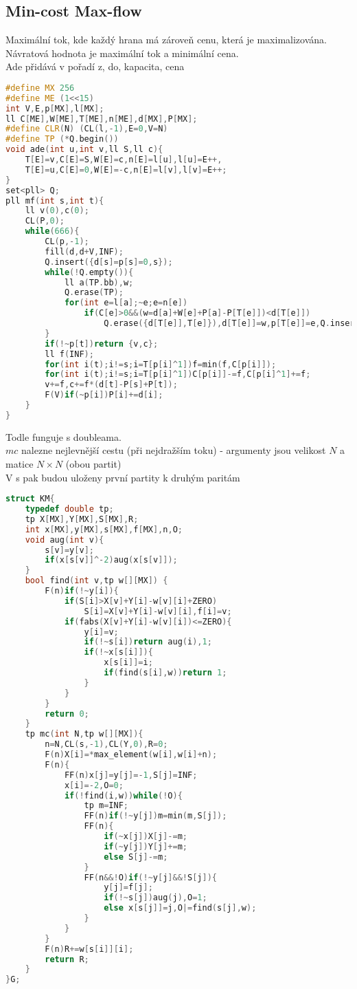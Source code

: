 \documentclass[11pt]{article}
\begin{document}
\subsection{Min-cost Max-flow}
Maximální tok, kde každý hrana má zároveň cenu, která je maximalizována.
\\Návratová hodnota je maximální tok a minimální cena.
\\Ade přidává v pořadí z, do, kapacita, cena
\begin{lstlisting}[language=C++]
#define MX 256
#define ME (1<<15)
int V,E,p[MX],l[MX];
ll C[ME],W[ME],T[ME],n[ME],d[MX],P[MX];
#define CLR(N) (CL(l,-1),E=0,V=N)
#define TP (*Q.begin())
void ade(int u,int v,ll S,ll c){
	T[E]=v,C[E]=S,W[E]=c,n[E]=l[u],l[u]=E++,
	T[E]=u,C[E]=0,W[E]=-c,n[E]=l[v],l[v]=E++;
}
set<pll> Q;
pll mf(int s,int t){
    ll v(0),c(0);
    CL(P,0);
    while(666){
        CL(p,-1);
        fill(d,d+V,INF);
        Q.insert({d[s]=p[s]=0,s});
        while(!Q.empty()){
            ll a(TP.bb),w;
            Q.erase(TP);
            for(int e=l[a];~e;e=n[e])
                if(C[e]>0&&(w=d[a]+W[e]+P[a]-P[T[e]])<d[T[e]])
                    Q.erase({d[T[e]],T[e]}),d[T[e]]=w,p[T[e]]=e,Q.insert({w,T[e]});
        }
        if(!~p[t])return {v,c};
        ll f(INF);
        for(int i(t);i!=s;i=T[p[i]^1])f=min(f,C[p[i]]);
        for(int i(t);i!=s;i=T[p[i]^1])C[p[i]]-=f,C[p[i]^1]+=f;
        v+=f,c+=f*(d[t]-P[s]+P[t]);
        F(V)if(~p[i])P[i]+=d[i];
    }
}
\end{lstlisting}
Todle funguje s doubleama.
\\$mc$ nalezne nejlevnější cestu (při nejdražším toku) - argumenty jsou velikost $N$ a matice $N \times N$ (obou partit)
\\V \textsf{s} pak budou uloženy první partity k druhým paritám
\begin{lstlisting}[language=C++]
struct KM{
    typedef double tp;
    tp X[MX],Y[MX],S[MX],R;
    int x[MX],y[MX],s[MX],f[MX],n,O;
    void aug(int v){
        s[v]=y[v];
        if(x[s[v]]^-2)aug(x[s[v]]);
    }
    bool find(int v,tp w[][MX]) {
        F(n)if(!~y[i]){
            if(S[i]>X[v]+Y[i]-w[v][i]+ZERO)
                S[i]=X[v]+Y[i]-w[v][i],f[i]=v;
            if(fabs(X[v]+Y[i]-w[v][i])<=ZERO){
                y[i]=v;
                if(!~s[i])return aug(i),1;
                if(!~x[s[i]]){
                    x[s[i]]=i;
                    if(find(s[i],w))return 1;
                }
            }
        }
        return 0;
    }
    tp mc(int N,tp w[][MX]){
        n=N,CL(s,-1),CL(Y,0),R=0;
        F(n)X[i]=*max_element(w[i],w[i]+n);
        F(n){
            FF(n)x[j]=y[j]=-1,S[j]=INF;
            x[i]=-2,O=0;
            if(!find(i,w))while(!O){
                tp m=INF;
                FF(n)if(!~y[j])m=min(m,S[j]);
                FF(n){
                    if(~x[j])X[j]-=m;
                    if(~y[j])Y[j]+=m;
                    else S[j]-=m;
                }
                FF(n&&!O)if(!~y[j]&&!S[j]){
                    y[j]=f[j];
                    if(!~s[j])aug(j),O=1;
                    else x[s[j]]=j,O|=find(s[j],w);
                }
            }
        }
        F(n)R+=w[s[i]][i];
        return R;
    }
}G;
\end{lstlisting}
\end{document}
